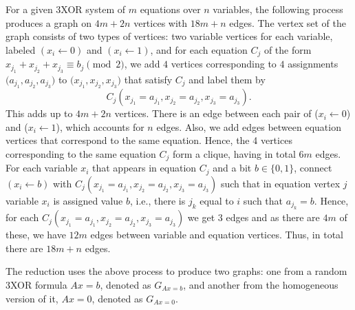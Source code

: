 \documentclass[a4paper,twoside,justified]{tufte-handout}
\begin{document}
For a given 3XOR system of $m$ equations over $n$ variables, the following process produces a graph
on $4m+2n$ vertices with $18m+n$ edges. The vertex set of the graph consists of two types of vertices:
two variable vertices for each
variable, labeled $(x_i \leftarrow 0)$ and $(x_i \leftarrow 1)$,
and for each equation $C_j$ of the form $x_{j_1}+x_{j_2}+x_{j_3} \equiv b_j \pmod{2}$, we add $4$ vertices corresponding
to $4$ assignments $\bigl(a_{j_1}, a_{j_2}, a_{j_3}\bigr)$ to $\bigl(x_{j_1},x_{j_2},x_{j_3}\bigr)$ that satisfy $C_j$ and 
label them by
\[
C_j\left(x_{j_1}=a_{j_1}, x_{j_2}=a_{j_2}, x_{j_3}=a_{j_3}\right).
\]
This adds up to $4 m + 2 n$ vertices.
There is an edge between each pair of ($x_i \leftarrow 0$) and ($x_i \leftarrow 1$), which accounts for $n$ edges.
Also, we add edges between equation vertices that correspond to the same equation.
Hence, the 4 vertices corresponding
to the same equation $C_j$ form a clique, having in total $6 m$ edges. For each variable
$x_i$ that appears in equation $C_j$ and a bit $b \in \{0,1\}$, connect
$(x_i \leftarrow b)$ with $C_j(x_{j_1}=a_{j_1}, x_{j_2}=a_{j_2}, x_{j_3}=a_{j_3})$ such that in equation vertex $j$ variable $x_i$ is assigned
value $b$, i.e., there is $j_k$ equal to $i$ such that $a_{j_k} = b$. Hence, for each 
$C_j(x_{j_1}=a_{j_1}, x_{j_2}=a_{j_2}, x_{j_3}=a_{j_3})$ we get $3$ edges and as there are $4 m$ of 
these, we have $12 m$ edges between variable and equation vertices. Thus, in total there are $18 m + n$ edges.

The reduction uses the above process to produce two graphs: one from a random 3XOR formula $Ax=b$,
denoted as $G_{Ax=b}$, and another from the homogeneous version of it, $Ax=0$, denoted as $G_{Ax=0}$.
\end{document}
